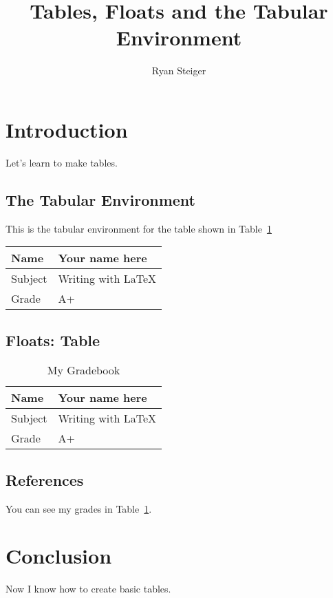 \documentclass{article}
\title{Tables, Floats and the Tabular Environment}
\author{Ryan Steiger}
\date{}
\begin{document}
\maketitle

\section{Introduction}

Let's learn to make tables.

\subsection{The Tabular Environment}

This is the tabular environment for the table shown in Table~\ref{tab:grades}

\bigskip

\begin{tabular}{|l||l|}
  \hline
  Name    & Your name here      \\
  \hline
  Subject & Writing with \LaTeX \\
  \hline
  Grade   & A+                  \\
  \hline
\end{tabular}

\subsection{Floats: Table}

\begin{table}[htbp]
  \caption{My Gradebook}
  \begin{center}
    \begin{tabular}{|l||l|}
      \hline
      Name    & Your name here      \\
      \hline
      Subject & Writing with \LaTeX \\
      \hline
      Grade   & A+                  \\
      \hline
    \end{tabular}
    \label{tab:grades}
  \end{center}
\end{table}

\subsection{References}

You can see my grades in Table~\ref{tab:grades}.

\section{Conclusion}

Now I know how to create basic tables.
\end{document}
